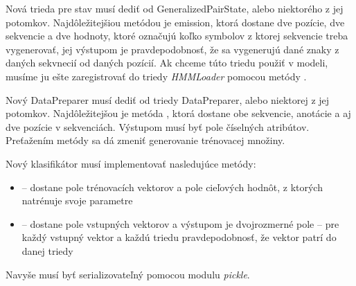 Nová trieda pre stav musí dediť od GeneralizedPairState, alebo niektorého z jej potomkov. Najdôležitejšiou metódou je emission, ktorá dostane dve pozície, dve sekvencie a dve hodnoty, ktoré označujú koľko symbolov z ktorej sekvencie treba vygenerovať, jej výstupom je pravdepodobnosť, že sa vygenerujú dané znaky z daných sekvnecií od daných pozícií. Ak chceme túto triedu použiť v modeli, musíme ju ešte zaregistrovať do triedy \textit{HMMLoader} pomocou metódy .

Nový DataPreparer musí dediť od triedy DataPreparer, alebo niektorej z jej potomkov. Najdôležitejšou je metóda , ktorá dostane obe sekvencie, anotácie a aj dve pozície v sekvenciách. Výstupom musí byť pole číselných atribútov. Preťažením metódy  sa dá zmeniť generovanie trénovacej množiny.

Nový klasifikátor musí implementovať nasledujúce metódy:
\begin{itemize}
    \item {} -- dostane pole trénovacích vektorov a pole cieľových hodnôt, z ktorých natrénuje svoje parametre
    \item {} -- dostane pole vstupných vektorov a výstupom je dvojrozmerné pole -- pre každý vstupný vektor a každú triedu pravdepodobnosť, že vektor patrí do danej triedy
\end{itemize}
Navyše musí byť serializovateľný pomocou modulu \textit{pickle}.
